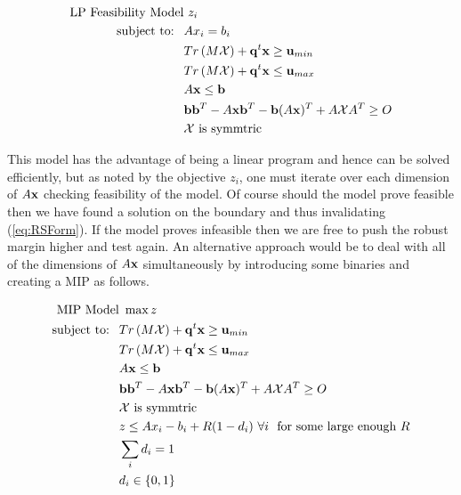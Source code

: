 \begin{subequations}\label{eq:OPTfeasrelaxLP1}
\begin{align}
 \text{LP Feasibility Model}& \ z_i  \\
 \text{subject to: } \ &Ax_i= b_i \\
 &Tr\left(M\mathcal{X}\right)+\bold q^t\bold x \geq \bold u_{min} \\
 & Tr\left(M\mathcal{X}\right)+\bold q^t\bold x \leq \bold u_{max} \\
 	&A\bold x\leq \bold b \\
 	&\bold b\bold b^T-A\bold x\bold b^T-\bold b(A\bold x)^T+A\mathcal{X}A^T\geq O \\
 	&\mathcal{X} \text{ is symmtric}
\end{align}
\end{subequations}

This model has the advantage of being a linear program and hence can be solved efficiently, but as noted by the objective $z_i$, one must iterate over each dimension of $A\bold x$ checking feasibility of the model. 
Of course should the model prove feasible then we have found a solution on the boundary and thus invalidating (\ref{eq:RSForm}). 
If the model proves infeasible then we are free to push the robust margin higher and test again. 
An alternative approach would be to deal with all of the dimensions of $A\bold x$ simultaneously by introducing some binaries and creating a MIP as follows. 

\begin{subequations}\label{eq:OPTfeasrelaxLP2}
\begin{align}
 \text{MIP Model}& \ \max z  \\
 \text{subject to: } \ &Tr\left(M\mathcal{X}\right)+\bold q^t\bold x \geq \bold u_{min} \\
 & Tr\left(M\mathcal{X}\right)+\bold q^t\bold x \leq \bold u_{max} \\
 	&A\bold x\leq \bold b \\
 	&\bold b\bold b^T-A\bold x\bold b^T-\bold b(A\bold x)^T+A\mathcal{X}A^T\geq O \\
 	&\mathcal{X} \text{ is symmtric} \\
 	& z\leq Ax_i-b_i+R(1-d_i) \ \forall i \ \text{ for some large enough $R$} \\
 	& \sum\limits_i d_i=1 \\
 	& d_i\in\{0,1\}
\end{align}
\end{subequations}

